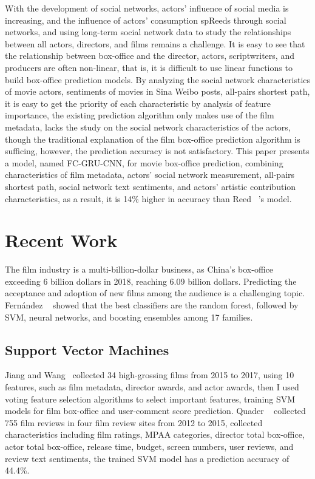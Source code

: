 \documentclass[review]{cvpr}
\begin{document}
  With the development of social networks, actors' influence of social media is increasing, and the influence of actors' consumption spReeds through social networks,
  and using long-term social network data to study the relationships between all actors, directors, and films remains a challenge.
  It is easy to see that the relationship between box-office and the director, actors, scriptwriters, and producers are often non-linear, that is,
  it is difficult to use linear functions to build box-office prediction models.
  By analyzing the social network characteristics of movie actors, sentiments of movies in Sina Weibo posts, all-pairs shortest path,
  it is easy to get the priority of each characteristic by analysis of feature importance,
  the existing prediction algorithm only makes use of the film metadata, lacks the study on the social network characteristics of the actors,
  though the traditional explanation of the film box-office prediction algorithm is sufficing, however, the prediction accuracy is not satisfactory.
  This paper presents a model, named FC-GRU-CNN, for movie box-office prediction, combining characteristics of film metadata, actors' social network measurement,
  all-pairs shortest path, social network text sentiments, and actors' artistic contribution characteristics,
  as a result, it is 14\% higher in accuracy than Reed \etal~\cite{reed2016learning}'s model.


\section{Recent Work}

  The film industry is a multi-billion-dollar business, as China's box-office exceeding 6 billion dollars in 2018, reaching 6.09 billion dollars.
  Predicting the acceptance and adoption of new films among the audience is a challenging topic.
  Fern{\'a}ndez \etal ~\cite{fernandez2014we} showed that the best classifiers are the random forest,
  followed by SVM, neural networks, and boosting ensembles among 17 families.


\subsection{Support Vector Machines}

  Jiang and Wang~\cite{jiang2018predicting} collected 34 high-grossing films from 2015 to 2017, using 10 features, such as film metadata, director awards, and actor awards, then I used voting feature selection algorithms to select important features,
  training SVM models for film box-office and user-comment score prediction.
  Quader \etal~\cite{quader2017machine} collected 755 film reviews in four film review sites from 2012 to 2015, collected characteristics including film ratings, MPAA categories,
  director total box-office, actor total box-office, release time, budget, screen numbers, user reviews, and review text sentiments,
  the trained SVM model has a prediction accuracy of 44.4\%.
\end{document}
